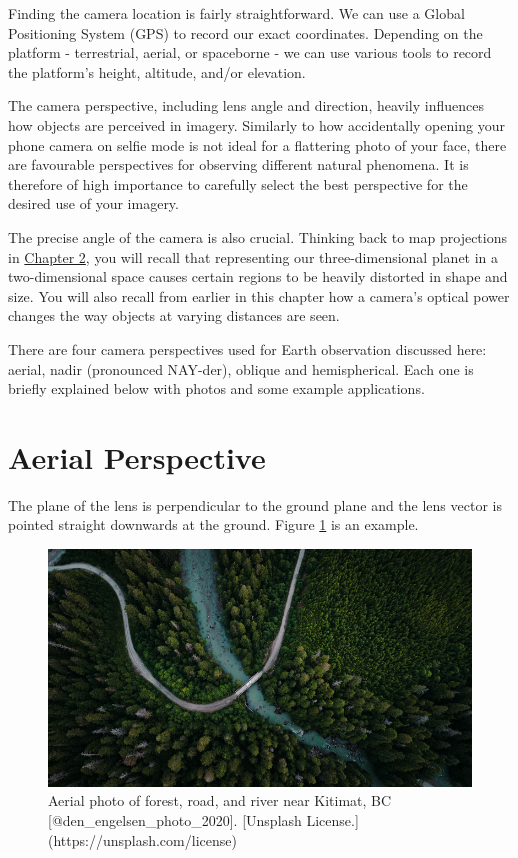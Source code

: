 \documentclass[
]{book}
\begin{document}
Finding the camera location is fairly straightforward. We can use a Global Positioning System (GPS) to record our exact coordinates. Depending on the platform - terrestrial, aerial, or spaceborne - we can use various tools to record the platform's height, altitude, and/or elevation.

The camera perspective, including lens angle and direction, heavily influences how objects are perceived in imagery. Similarly to how accidentally opening your phone camera on selfie mode is not ideal for a flattering photo of your face, there are favourable perspectives for observing different natural phenomena. It is therefore of high importance to carefully select the best perspective for the desired use of your imagery.

The precise angle of the camera is also crucial. Thinking back to map projections in \href{https://ubc-geomatics-textbook.github.io/geomatics-textbook/mapping-data.html}{Chapter 2}, you will recall that representing our three-dimensional planet in a two-dimensional space causes certain regions to be heavily distorted in shape and size. You will also recall from earlier in this chapter how a camera's optical power changes the way objects at varying distances are seen.

There are four camera perspectives used for Earth observation discussed here: aerial, nadir (pronounced NAY-der), oblique and hemispherical. Each one is briefly explained below with photos and some example applications.

\section{Aerial Perspective}\label{aerial-perspective}

The plane of the lens is perpendicular to the ground plane and the lens vector is pointed straight downwards at the ground. Figure \ref{fig:12-aerial-plane} is an example.

\begin{figure}
\includegraphics[width=0.9\linewidth]{images/12-aerial-plane} \caption{Aerial photo of forest, road, and river near Kitimat, BC [@den_engelsen_photo_2020]. [Unsplash License.](https://unsplash.com/license)}\label{fig:12-aerial-plane}
\end{figure}
\end{document}

